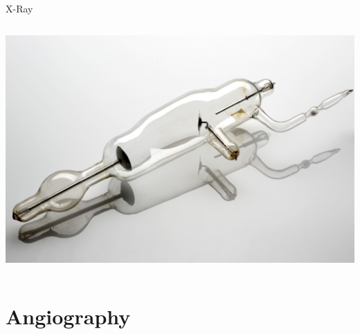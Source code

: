 \begin{frame}[c]{X-Ray}
\begin{columns}[c, onlytextwidth]
\begin{column}{0.45\textwidth}
		\includegraphics[height=0.4\textheight]{images/x-ray_tube.jpg}
	\end{column}
\end{columns}


\end{frame}

\section{Angiography}


